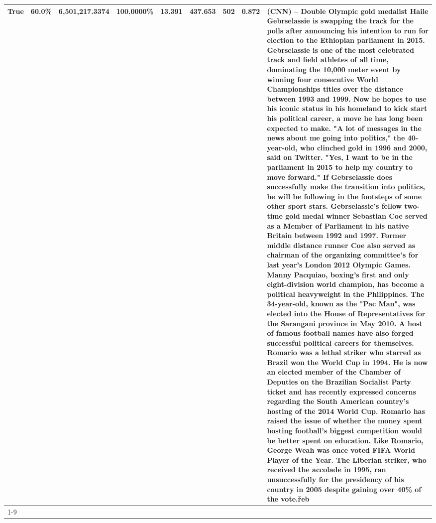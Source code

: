 \begin{table}[H]
{\begin{tabular}{lllrlllll}
True & 60.0\% & 6,501,217.3374 & \bfseries \color{red} 100.0000\% & 13.391 & 437.653 & 502 & 0.872 & (CNN) -- Double Olympic gold medalist Haile Gebrselassie is swapping the track for the polls after announcing his intention to run for election to the Ethiopian parliament in 2015. Gebrselassie is one of the most celebrated track and field athletes of all time, dominating the 10,000 meter event by winning four consecutive World Championships titles over the distance between 1993 and 1999. Now he hopes to use his iconic status in his homeland to kick start his political career, a move he has long been expected to make. "A lot of messages in the news about me going into politics," the 40-year-old, who clinched gold in 1996 and 2000, said on Twitter. "Yes, I want to be in the parliament in 2015 to help my country to move forward." If Gebrselassie does successfully make the transition into politics, he will be following in the footsteps of some other sport stars. Gebrselassie's fellow two-time gold medal winner Sebastian Coe served as a Member of Parliament in his native Britain between 1992 and 1997. Former middle distance runner Coe also served as chairman of the organizing committee's for last year's London 2012 Olympic Games. Manny Pacquiao, boxing's first and only eight-division world champion, has become a political heavyweight in the Philippines. The 34-year-old, known as the "Pac Man", was elected into the House of Representatives for the Sarangani province in May 2010. A host of famous football names have also forged successful political careers for themselves. Romario was a lethal striker who starred as Brazil won the World Cup in 1994. He is now an elected member of the Chamber of Deputies on the Brazilian Socialist Party ticket and has recently expressed concerns regarding the South American country's hosting of the 2014 World Cup. Romario has raised the issue of whether the money spent hosting football's biggest competition would be better spent on education. Like Romario, George Weah was once voted FIFA World Player of the Year. The Liberian striker, who received the accolade in 1995, ran unsuccessfully for the presidency of his country in 2005 despite gaining over 40\% of the vote.řeb \\
\cline{1-9}

\end{tabular}}
\end{table}

